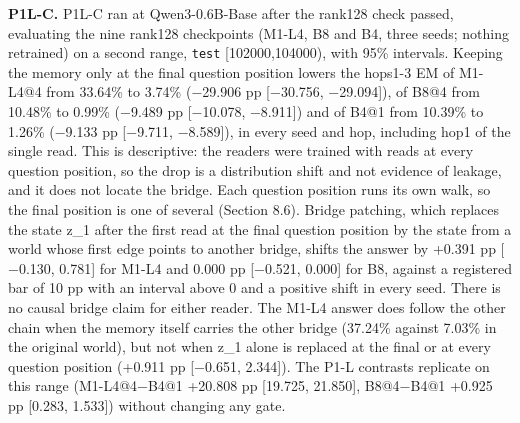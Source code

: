 \textbf{P1L-C.} P1L-C ran at Qwen3-0.6B-Base after the rank128 check passed, evaluating the nine rank128 checkpoints (M1-L4, B8 and B4, three seeds;
nothing retrained) on a second range, \texttt{test} [102000,104000), with 95\% intervals. Keeping the memory only at the final question
position lowers the hops1-3 EM of M1-L4@4 from 33.64\% to 3.74\% (\ensuremath{-}29.906 pp [\ensuremath{-}30.756, \ensuremath{-}29.094]), of B8@4 from 10.48\% to 0.99\%
(\ensuremath{-}9.489 pp [\ensuremath{-}10.078, \ensuremath{-}8.911]) and of B4@1 from 10.39\% to 1.26\% (\ensuremath{-}9.133 pp [\ensuremath{-}9.711, \ensuremath{-}8.589]), in every seed and hop,
including hop1 of the single read. This is descriptive: the readers were trained with reads at every question position, so the
drop is a distribution shift and not evidence of leakage, and it does not locate the bridge. Each question position runs its own walk, so the final position is one of several (Section 8.6). Bridge patching, which  %
replaces the state z\_1 after the first read at the final question position by the state from a world whose first edge points to
another bridge, shifts the answer by +0.391 pp [\ensuremath{-}0.130, 0.781] for M1-L4 and 0.000 pp [\ensuremath{-}0.521, 0.000] for B8, against a
registered bar of 10 pp with an interval above 0 and a positive shift in every seed. There is no causal bridge  %
claim for either reader. The M1-L4 answer does follow the other chain when the memory itself carries the other bridge (37.24\%
against 7.03\% in the original world), but not when z\_1 alone is replaced at the final or at every question position (+0.911 pp
[\ensuremath{-}0.651, 2.344]). The P1-L contrasts replicate on this range (M1-L4@4\ensuremath{-}B4@1 +20.808 pp [19.725, 21.850], B8@4\ensuremath{-}B4@1  %
+0.925 pp [0.283, 1.533]) without changing any gate.  %

